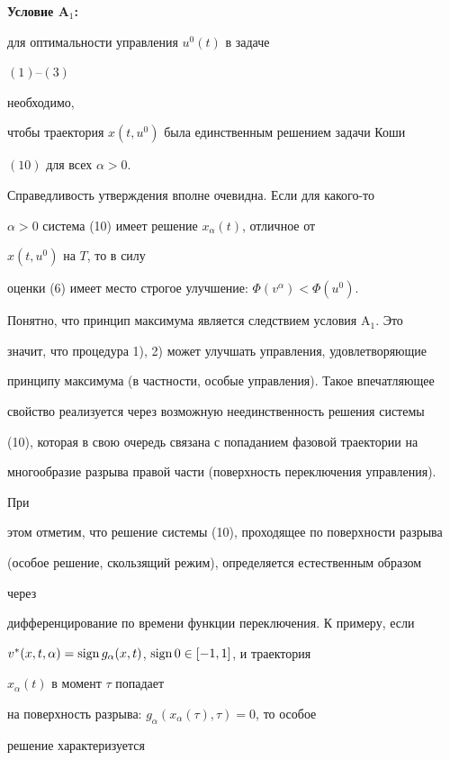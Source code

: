  


{\bf Условие A${}_1$:}


{\it


для оптимальности управления $u^0(t)$ в задаче 


$(1)$--$(3)$


необходимо, 


чтобы траектория $x(t,u^0)$ была единственным решением задачи Коши


$(10)$ для всех $\alpha>0$. 


}


 


Справедливость утверждения вполне очевидна. Если для какого-то 


$\alpha>0$ система (10) имеет решение $x_\alpha(t)$, отличное от 


$x(t,u^0)$ на $T$, то в силу 


оценки (6) имеет место строгое улучшение: $\Phi(v^\alpha)<\Phi(u^0)$. 


 


Понятно, что принцип максимума является следствием условия A${}_1$. Это 


значит, что процедура 1), 2) может улучшать управления, удовлетворяющие 


принципу максимума (в частности, особые управления). Такое впечатляющее 


свойство реализуется через возможную неединственность решения системы 


(10), которая в свою очередь связана с попаданием фазовой траектории на 


многообразие разрыва правой части (поверхность переключения управления). 


При 


этом отметим, что решение системы (10), проходящее по поверхности разрыва 


(особое решение, скользящий режим), определяется естественным образом 


через 


дифференцирование по времени функции переключения. К примеру, если 


$v^*(x,t,\alpha)=\operatorname{sign} g_\alpha(x,t)$, $\operatorname{sign} 0\in[-1,1]$, и траектория 


$x_\alpha(t)$ в момент $\tau$ попадает 


на поверхность разрыва: $g_\alpha(x_\alpha(\tau),\tau)=0$, то особое 


решение характеризуется 


